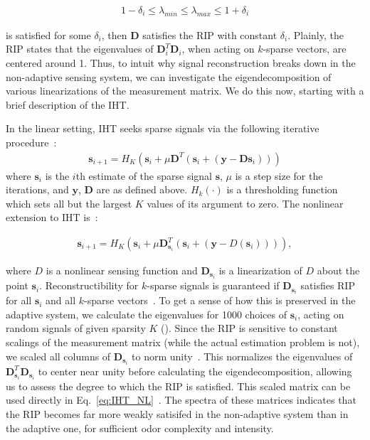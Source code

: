 \documentclass[9pt,lineno]{elife}
\begin{document}
\begin{align}
1 - \delta_i \leq \lambda_{min} \leq \lambda_{max} \leq 1 + \delta_i
\end{align}

is satisfied for some $\delta_i$, then $\mathbf D$ satisfies the RIP with constant $\delta_i$. Plainly, the RIP states that the eigenvalues of $\mathbf {D}_i^T\mathbf {D}_i$, when acting on $k$-sparse vectors, are centered around 1. Thus, to intuit why signal reconstruction breaks down in the non-adaptive sensing system, we can investigate the eigendecomposition of various linearizations of the measurement matrix. We do this now, starting with a brief description of the IHT.

In the linear setting, IHT seeks sparse signals via the following iterative procedure~\citep{IHT}:
\begin{align}
\mathbf{s}_{i + 1} = H_K(\mathbf{s}_i + \mu\mathbf{D}^T(\mathbf {s}_i + (\mathbf y - \mathbf D\mathbf {s}_i)))
\label{eq:IHT}
\end{align}
where $\mathbf{s}_i$ is the $i$th estimate of the sparse signal $\mathbf{s}$, $\mu$ is a step size for the iterations, and $\mathbf y$, $\mathbf D$ are as defined above. $H_k(\cdot)$ is a thresholding function which sets all but the largest $K$ values of its argument to zero. The nonlinear extension to IHT is~\citep{nonlin_CS}:

\begin{align}
\mathbf{s}_{i + 1} = H_K(\mathbf{s}_i + \mu\mathbf{D}_{\mathbf s_i}^T(\mathbf {s}_i + (\mathbf y - D(\mathbf {s}_i)))),
\label{eq:IHT_NL}
\end{align}

where $D$ is a nonlinear sensing function and $\mathbf{D}_{\mathbf s_i}$ is a linearization of $D$ about the point $\mathbf s_i$. Reconstructibility for $k$-sparse signals is guaranteed if $\mathbf{D}_{\mathbf s_i}$ satisfies RIP for all $\mathbf s_i$ and all $k$-sparse vectors~\citep{IHT}. To get a sense of how this is preserved in the adaptive system, we calculate the eigenvalues for 1000 choices of $\mathbf s_i$, acting on random signals of given sparsity $K$ (). Since the RIP is sensitive to constant scalings of the measurement matrix (while the actual estimation problem is not), we scaled all columns of $\mathbf{D}_{\mathbf s_i}$ to norm unity~\citep{using_IHT}. This normalizes the eigenvalues of $\mathbf{D}^T_{\mathbf s_i}\mathbf{D}_{\mathbf s_i}$ to center near unity before calculating the eigendecomposition, allowing us to assess the degree to which the RIP is satisfied. This scaled matrix can be used directly in Eq.~\ref{eq:IHT_NL}~\citep{nonlin_CS,using_IHT}. The spectra of these matrices indicates that the RIP becomes far more weakly satisifed in the non-adaptive system than in the adaptive one, for sufficient odor complexity and intensity. \\
\end{document}
